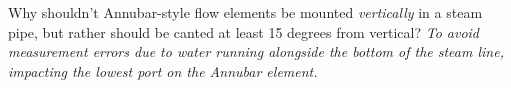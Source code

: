 \vskip 10pt

Why shouldn't Annubar-style flow elements be mounted {\it vertically} in a steam pipe, but rather should be canted at least 15 degrees from vertical?  {\it To avoid measurement errors due to water running alongside the bottom of the steam line, impacting the lowest port on the Annubar element.}












